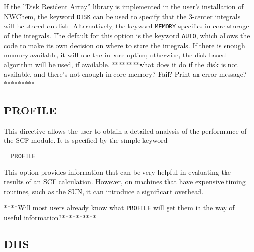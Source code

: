 If the ''Disk Resident Array'' library is implemented in the user's
installation of NWChem, the keyword \verb+DISK+ can be used 
to specify that the 3-center integrals will be stored on disk.  Alternatively,
the keyword \verb+MEMORY+ specifies in-core storage of the integrals.
The default for this option is the keyword \verb+AUTO+, which allows the
code to make its own decision on where to store the integrals.  If there
is enough memory available, it will use the in-core option; otherwise,
the disk based algorithm will be used, if available.
\Large
********what does it do if the disk is not available, and there's not
enough in-core memory?  Fail? Print an error message?*********
\normalsize



\subsection{PROFILE}

This directive allows the user to obtain a detailed analysis of the 
performance of the SCF module.  It is specified by the simple keyword

\begin{verbatim}
  PROFILE
\end{verbatim}

This option provides information that can be very helpful
in evaluating the results of an SCF calculation.  However, on machines
that have expensive timing routines, such as the SUN, it can introduce
a significant overhead.

\Large
****Will most users already know what \verb+PROFILE+ will get them in the
way of useful information?**********
\normalsize


\subsection{DIIS}

